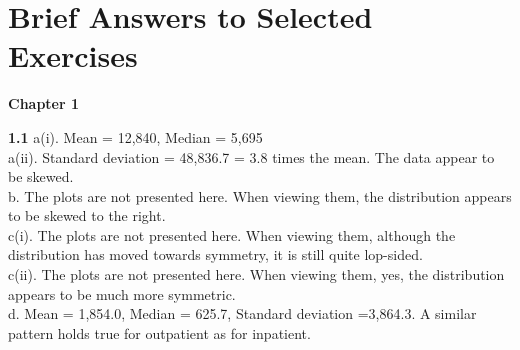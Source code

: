 \chapter*{Brief Answers to Selected Exercises}
\vspace{-1in}

\begin{center}\large \textbf{Chapter 1}\end{center}

\textbf{1.1}
a(i). Mean = 12,840, Median = 5,695\\
a(ii). Standard deviation = 48,836.7 = 3.8 times the mean. The data appear to be skewed.\\
b. The plots are not presented here. When viewing them, the
distribution appears to
be skewed to the right.\\
c(i). The plots are not presented here. When viewing them, although
the distribution has moved towards symmetry, it is still
quite lop-sided.\\
c(ii). The plots are not presented here. When viewing them, yes,
the distribution appears to be much more symmetric. \\
d. Mean = 1,854.0, Median = 625.7, Standard deviation =3,864.3. A
similar
pattern holds true for outpatient as for inpatient.\\


